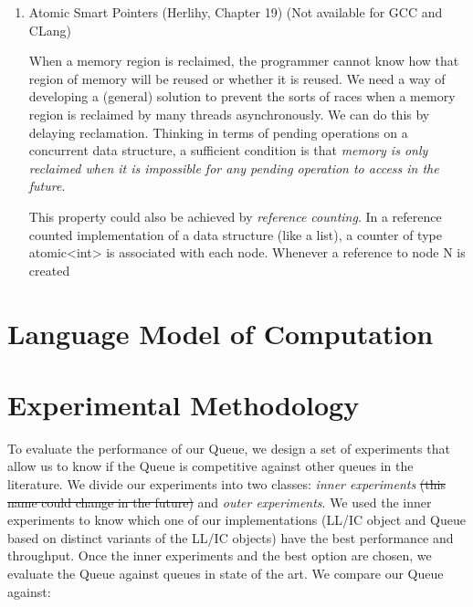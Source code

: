 \begin{enumerate}
\begin{lstlisting}[language=c++,label= ,caption= ,captionpos=b,numbers=none]
void func() {
    std::atomic<void*>& hp = get_hazard_pointer_for_current_thread();
    void* old_data = data.load();
    do {
        void* temp;
        do{ // Loop until you've set the hazard pointer
            temp = old_data;
            hp.store(old_data);
            old_data = data.load();
        } while (old_data != temp);
          }while (old_data &&
            !data.compare_exchange_strong(old_data, old_data->next);
    // Do something with old_data
    hp.store(nullptr); // clearing usage of hazard pointer
    // Trying clearing
    if (outstanding_hazard_pointers_for(old_head))
    {
        reclaim_later(old_data);
    }
    else
    {
        delete old_data;
    }
    delete_nodes_with_no_hazards();
}
\end{lstlisting}


\item Atomic Smart Pointers (Herlihy, Chapter 19) (Not available for GCC and CLang)
\label{sec:org58c7cdb}


When a memory region is reclaimed, the programmer cannot know how that
region of memory will be reused or whether it is reused. We need a
way of developing a (general) solution to prevent the sorts of races
when a memory region is reclaimed by many threads asynchronously. We can 
do this by delaying reclamation.
Thinking in terms of pending operations on a concurrent data structure, a
sufficient condition is that \emph{memory is only reclaimed when it is impossible
for any pending operation to access in the future}.

This property could also be achieved by \emph{reference counting}. In a reference
counted implementation of a data structure (like a list), a counter of type
atomic<int> is associated with each node. Whenever a reference to node N is
created
\end{enumerate}

\section{\label{sec:practical-model}Language Model of Computation}
\section{\label{sec:methodology}Experimental Methodology}

\label{sec:orgebd0619}

To evaluate the performance of our Queue, we design a set of experiments that
allow us to know if the Queue is competitive against other queues in the
literature. We divide our experiments into two classes: \emph{inner experiments}
\sout{(this name could change in the future)} and \emph{outer experiments}. We used the
inner experiments to know which one of our implementations (LL/IC object and
Queue based on distinct variants of the LL/IC objects) have the best
performance and throughput. Once the inner experiments and the best
option are chosen, we evaluate the Queue against queues in state of the
art. We compare our Queue against:

